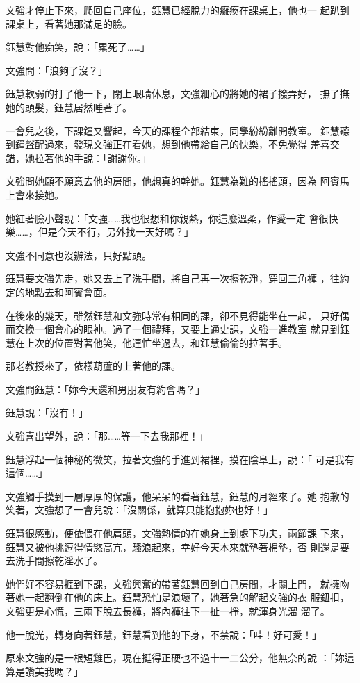 文強才停止下來，爬回自己座位，鈺慧已經脫力的癱瘓在課桌上，他也一
起趴到課桌上，看著她那滿足的臉。

鈺慧對他痴笑，說：「累死了……」

文強問：「浪夠了沒？」

鈺慧軟弱的打了他一下，閉上眼睛休息，文強細心的將她的裙子撥弄好，
撫了撫她的頭髮，鈺慧居然睡著了。

一會兒之後，下課鐘又響起，今天的課程全部結束，同學紛紛離開教室。
鈺慧聽到鐘聲醒過來，發現文強正在看她，想到他帶給自己的快樂，不免覺得
羞喜交錯，她拉著他的手說：「謝謝你。」

文強問她願不願意去他的房間，他想真的幹她。鈺慧為難的搖搖頭，因為
阿賓馬上會來接她。

她紅著臉小聲說：「文強……我也很想和你親熱，你這麼溫柔，作愛一定
會很快樂……，但是今天不行，另外找一天好嗎？」

文強不同意也沒辦法，只好點頭。

鈺慧要文強先走，她又去上了洗手間，將自己再一次擦乾淨，穿回三角褲
，往約定的地點去和阿賓會面。

在後來的幾天，雖然鈺慧和文強時常有相同的課，卻不見得能坐在一起，
只好偶而交換一個會心的眼神。過了一個禮拜，又要上通史課，文強一進教室
就見到鈺慧在上次的位置對著他笑，他連忙坐過去，和鈺慧偷偷的拉著手。

那老教授來了，依樣葫蘆的上著他的課。

文強問鈺慧：「妳今天還和男朋友有約會嗎？」

鈺慧說：「沒有！」

文強喜出望外，說：「那……等一下去我那裡！」

鈺慧浮起一個神秘的微笑，拉著文強的手進到裙裡，摸在陰阜上，說：「
可是我有這個……」

文強觸手摸到一層厚厚的保護，他呆呆的看著鈺慧，鈺慧的月經來了。她
抱歉的笑著，文強想了一會兒說：「沒關係，就算只能抱抱妳也好！」

鈺慧很感動，便依偎在他肩頭，文強熱情的在她身上到處下功夫，兩節課
下來，鈺慧又被他挑逗得情慾高亢，騷浪起來，幸好今天本來就墊著棉墊，否
則還是要去洗手間擦乾淫水了。

她們好不容易捱到下課，文強興奮的帶著鈺慧回到自己房間，才關上門，
就擁吻著她一起翻倒在他的床上。鈺慧恐怕是浪壞了，她著急的解起文強的衣
服鈕扣，文強更是心慌，三兩下脫去長褲，將內褲往下一扯一掙，就渾身光溜
溜了。

他一脫光，轉身向著鈺慧，鈺慧看到他的下身，不禁說：「哇！好可愛！」

原來文強的是一根短雞巴，現在挺得正硬也不過十一二公分，他無奈的說
：「妳這算是讚美我嗎？」

